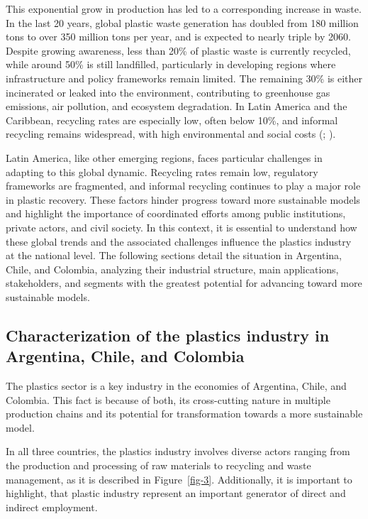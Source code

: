 \documentclass[
  12pt,
  oneside]{book}
\begin{document}
This exponential grow in production has led to a corresponding increase
in waste. In the last 20 years, global plastic waste generation has
doubled from 180 million tons to over 350 million tons per year, and is
expected to nearly triple by 2060. Despite growing awareness, less than
20\% of plastic waste is currently recycled, while around 50\% is still
landfilled, particularly in developing regions where infrastructure and
policy frameworks remain limited. The remaining 30\% is either
incinerated or leaked into the environment, contributing to greenhouse
gas emissions, air pollution, and ecosystem degradation. In Latin
America and the Caribbean, recycling rates are especially low, often
below 10\%, and informal recycling remains widespread, with high
environmental and social costs (;
).

Latin America, like other emerging regions, faces particular challenges
in adapting to this global dynamic. Recycling rates remain low,
regulatory frameworks are fragmented, and informal recycling continues
to play a major role in plastic recovery. These factors hinder progress
toward more sustainable models and highlight the importance of
coordinated efforts among public institutions, private actors, and civil
society. In this context, it is essential to understand how these global
trends and the associated challenges influence the plastics industry at
the national level. The following sections detail the situation in
Argentina, Chile, and Colombia, analyzing their industrial structure,
main applications, stakeholders, and segments with the greatest
potential for advancing toward more sustainable models.

\subsection{Characterization of the plastics industry in Argentina,
Chile, and
Colombia}\label{characterization-of-the-plastics-industry-in-argentina-chile-and-colombia}

The plastics sector is a key industry in the economies of Argentina,
Chile, and Colombia. This fact is because of both, its cross-cutting
nature in multiple production chains and its potential for
transformation towards a more sustainable model.

In all three countries, the plastics industry involves diverse actors
ranging from the production and processing of raw materials to recycling
and waste management, as it is described in Figure~\ref{fig-3}.
Additionally, it is important to highlight, that plastic industry
represent an important generator of direct and indirect employment.
\end{document}
